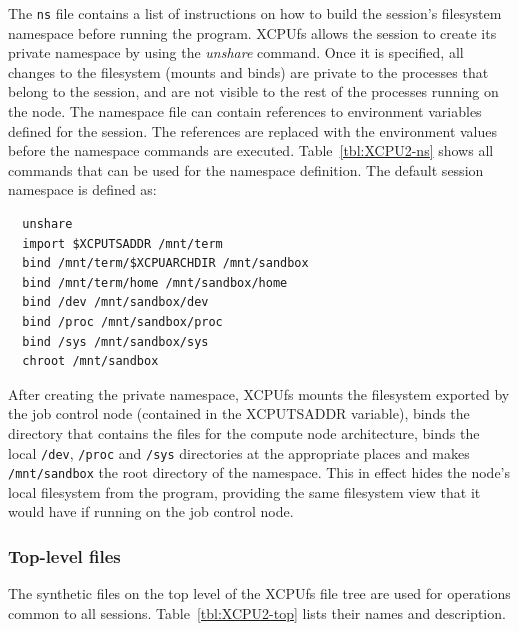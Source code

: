 \documentclass[10pt,conference,letterpaper]{IEEEtran}
\begin{document}
The \texttt{ns} file contains a list of instructions on how to build the
session's filesystem namespace before running the program. XCPUfs allows the
session to create its private namespace by using the \textsl{unshare}
command. Once it is specified, all changes to the filesystem (mounts and
binds) are private to the processes that belong to the session, and are not
visible to the rest of the processes running on the node. The namespace file
can contain references to environment variables defined for the session. The
references are replaced with the environment values before the namespace
commands are executed. Table~\ref{tbl:XCPU2-ns} shows all commands that can
be used for the namespace definition. The default session namespace is
defined as:

\begin{verbatim}
  unshare
  import $XCPUTSADDR /mnt/term
  bind /mnt/term/$XCPUARCHDIR /mnt/sandbox
  bind /mnt/term/home /mnt/sandbox/home
  bind /dev /mnt/sandbox/dev
  bind /proc /mnt/sandbox/proc
  bind /sys /mnt/sandbox/sys
  chroot /mnt/sandbox
\end{verbatim}

After creating the private namespace, XCPUfs mounts the filesystem exported
by the job control node (contained in the XCPUTSADDR variable), binds the
directory that contains the files for the compute node architecture, binds
the local \texttt{/dev}, \texttt{/proc} and \texttt{/sys} directories at the
appropriate places and makes \texttt{/mnt/sandbox} the root directory of the
namespace. This in effect hides the node's local filesystem from the
program, providing the same filesystem view that it would have if running on
the job control node.

\subsubsection{Top-level files}

The synthetic files on the top level of the XCPUfs file tree are used for
operations common to all sessions. Table~\ref{tbl:XCPU2-top} lists their
names and description.
\end{document}
